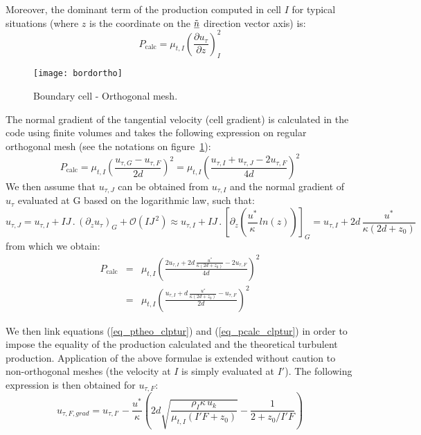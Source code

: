 Moreover, the dominant term of the production computed in cell $I$ for typical situations (where $z$ is the coordinate on the $\underline{\tilde{n}}$ direction vector axis) is:
\begin{equation}
P_{\text{calc}} =
\mu_{t,I}\left(\displaystyle\frac{\partial u_\tau}{\partial z}\right)^2_{I}
\end{equation}

\begin{figure}[h]
\centerline{\texttt{[image: bordortho]}}
\caption{\label{fig_bord_ortho_clptur}Boundary cell - Orthogonal mesh.}
\end{figure}

The normal gradient of the tangential velocity (cell gradient) is calculated in the code
using finite volumes and takes the following expression on regular orthogonal mesh (see the notations on figure~\ref{fig_bord_ortho_clptur}):
\begin{equation}
P_{\text{calc}} =
\mu_{t,I}\left(\displaystyle\frac{u_{\tau,G}-u_{\tau,F}}{2d}\right)^2 =
\mu_{t,I}\left(\displaystyle\frac{u_{\tau,I}+u_{\tau,J}-2u_{\tau,F}}{4d}\right)^2
\end{equation}
We then assume that $u_{\tau,J}$ can be obtained from $u_{\tau,I}$
and the normal gradient of $u_{\tau}$ evaluated at G based on the logarithmic
law, such that:
\begin{equation}
\label{eq_dvp_lim_utau}
u_{\tau,J}=u_{\tau,I}+ IJ\,.\,(\partial_z u_{\tau})_G+\mathcal{O} (IJ^{\,2}) \approx
u_{\tau,I}+ IJ\,.\,\left[\partial_z \left(\displaystyle
\frac{u^*}{\kappa}\,ln{ (z)} \right)\right]_G=
u_{\tau,I}+2d \, \displaystyle\frac{u^*}{\kappa \left(2d + z_0\right)}
\end{equation}
from which we obtain:
\begin{equation}\label{eq_pcalc_clptur}
\begin{array}{lll}
P_{\text{calc}}
&=&\mu_{t,I}\left(\displaystyle\frac{2u_{\tau,I}+2d  \, \displaystyle\frac{\,u^*}{\kappa
	     \left(2d + z_0\right) } -2u_{\tau,F}}{4d}\right)^2 \\
&=&
\mu_{t,I}\left(\displaystyle\frac{u_{\tau,I}+d \,\displaystyle\frac{\,u^*}{\kappa
	  \left(2d + z_0\right)} -u_{\tau,F}}{2d}\right)^2
\end{array}
\end{equation}

We then link equations (\ref{eq_ptheo_clptur}) and (\ref{eq_pcalc_clptur}) in order to impose
the equality of the production calculated and the theoretical turbulent production.
Application of the above formulae is extended without caution to non-orthogonal meshes
(the velocity at $I$ is simply evaluated at $I'$). The following expression is
then obtained for $u_{\tau,F}$:
\begin{equation}
u_{\tau,F,grad} =u_{\tau,I'}-\displaystyle\frac{u^*}{\kappa}\left(
2d\sqrt{\displaystyle\frac{\rho_I\kappa\, u_k }{\mu_{t,I} \left(I'F
							   +z_0\right) }
}-\displaystyle\frac{1}{2 + z_0/I'F}\right)
\end{equation}

